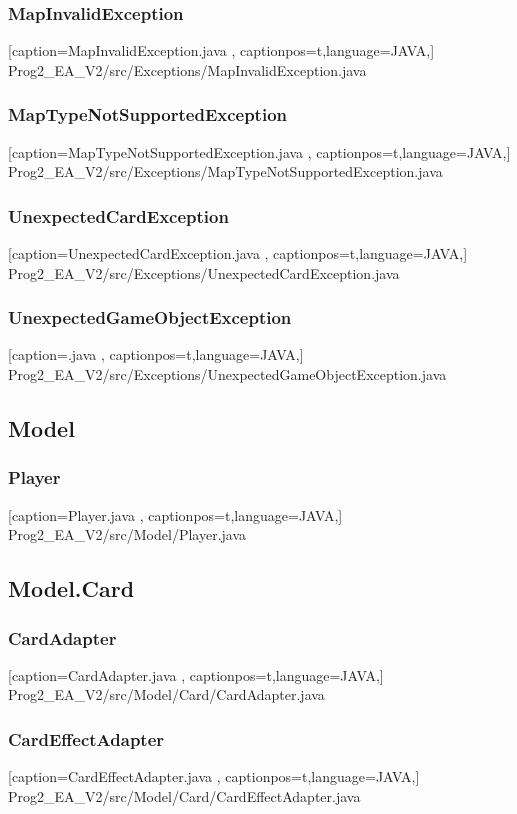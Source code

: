 \documentclass[a4paper,12pt]{scrartcl}
\begin{document}
	\subsubsection{MapInvalidException}
	
	[caption={MapInvalidException.java}
	\label{lst:javaclass},
	captionpos=t,language=JAVA,]
	{Prog2_EA_V2/src/Exceptions/MapInvalidException.java}
	\subsubsection{MapTypeNotSupportedException}
	
	[caption={MapTypeNotSupportedException.java}
	\label{lst:javaclass},
	captionpos=t,language=JAVA,]
	{Prog2_EA_V2/src/Exceptions/MapTypeNotSupportedException.java}
	\subsubsection{UnexpectedCardException}
	
	[caption={UnexpectedCardException.java}
	\label{lst:javaclass},
	captionpos=t,language=JAVA,]
	{Prog2_EA_V2/src/Exceptions/UnexpectedCardException.java}
	\subsubsection{UnexpectedGameObjectException}
	
	[caption={.java}
	\label{lst:javaclass},
	captionpos=t,language=JAVA,]
	{Prog2_EA_V2/src/Exceptions/UnexpectedGameObjectException.java}
	\subsection{Model}
	\subsubsection{Player}
	
	[caption={Player.java}
	\label{lst:javaclass},
	captionpos=t,language=JAVA,]
	{Prog2_EA_V2/src/Model/Player.java}
	\subsection{Model.Card}
	\subsubsection{CardAdapter}
	
	[caption={CardAdapter.java}
	\label{lst:javaclass},
	captionpos=t,language=JAVA,]
	{Prog2_EA_V2/src/Model/Card/CardAdapter.java}
	\subsubsection{CardEffectAdapter}
	
	[caption={CardEffectAdapter.java}
	\label{lst:javaclass},
	captionpos=t,language=JAVA,]
	{Prog2_EA_V2/src/Model/Card/CardEffectAdapter.java}
\end{document}
